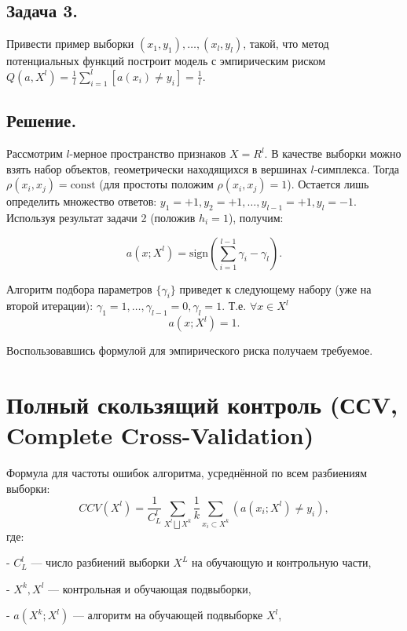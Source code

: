 \subsection*{Задача 3.}

Привести пример выборки $(x_1, y_1),\dots,(x_l, y_l)$, такой, что метод потенциальных функций построит модель с эмпирическим риском $ Q(a,X^l) = \frac{1}{l} \sum\limits_{i=1}^{l} [a(x_i) \neq y_i] = \frac{1}{l}$.

\subsection*{Решение.}

Рассмотрим $l$-мерное пространство признаков $X=R^l$. В качестве выборки можно взять набор объектов, геометрически находящихся в вершинах $l$-симплекса. Тогда $\rho(x_i, x_j) = \text{const}$ (для простоты положим $\rho(x_i, x_j) = 1$). Остается лишь определить множество ответов: $y_1=+1, y_2=+1, \dots, y_{l-1}=+1, y_l=-1$. Используя результат задачи 2 (положив $h_i=1$), получим:

\begin{equation*}
	\displaystyle a(x; X^l) =  \text{sign} ( \sum\limits_{i=1}^{l-1} \gamma_i - \gamma_l).
\end{equation*}

Алгоритм подбора параметров $\{\gamma_i\}$ приведет к следующему набору (уже на второй итерации): $\gamma_1=1, \dots, \gamma_{l-1}=0, \gamma_l=1$. Т.е. $\forall x \in X^l$ 
\begin{equation*}
	\displaystyle a(x; X^l) = 1.
\end{equation*}

Воспользовавшись формулой для эмпирического риска получаем требуемое.

\section{Полный скользящий контроль (ССV, Complete Cross-Validation)}
 

Формула для частоты ошибок алгоритма, усреднённой по всем разбиениям выборки: 
$$CCV(X^l) = \frac{1}{C_L^l} \sum_{X^l \bigsqcup  X^k} \frac{1}{k} \sum_{x_i \subset X^k} (a(x_i; X^l) \neq y_i),$$где:  

- $C_L^l$ — число разбиений выборки $X^L$ на обучающую и контрольную части,  

- $X^k, X^l$ — контрольная и обучающая подвыборки, 

- $a(X^k; X^l)$ — алгоритм на обучающей подвыборке $X^l$, 


